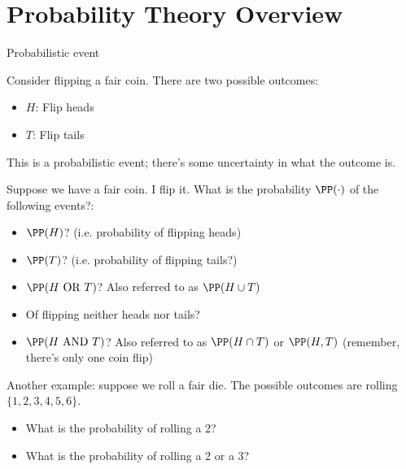 
\section[Probability theory]{Probability Theory Overview}
\miniframesoff
\begin{frame}
    \tableofcontents[currentsection]
\end{frame}
\miniframeson

\begin{frame}{Probabilistic event}

Consider flipping a fair coin. There are two possible outcomes: 

\begin{itemize}
    \item $H$: Flip heads
    \item $T$: Flip tails
\end{itemize}

\vspace{2ex}
This is a \alert<2>{probabilistic event}; there's some uncertainty in what the outcome is. 


\vspace{2ex}
Suppose we have a fair coin. I flip it. What is the probability $\PP (\cdot)$ of the following events?:
\begin{itemize}
    \item $\PP (H)$? (i.e. probability of flipping heads)
    \item $\PP (T)$? (i.e. probability of flipping tails?)
    \item $\PP (H \text{ OR } T)$? Also referred to as $\PP (H \cup T)$
    \item Of flipping neither heads nor tails?
    \item $\PP (H \text { AND } T)$? Also referred to as $\PP (H \cap T)$ or $\PP (H, T)$ (remember, there's only one coin flip)
\end{itemize}

\vspace{2ex}
Another example: suppose we roll a fair die. The possible outcomes are rolling $\{1, 2, 3, 4, 5, 6\}$.
\begin{itemize}
    \item What is the probability of rolling a 2?
    \item What is the probability of rolling a 2 or a 3?
\end{itemize}

\end{frame}

